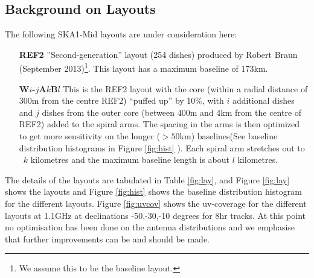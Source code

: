 \documentclass[sfheadings,a4paper,10pt,floats,floatfix]{article}
\begin{document}
\subsection{Background on Layouts}\label{sec:layouts}
The following SKA1-Mid layouts are under consideration here:
\begin{itemize}
\item[{\bf REF2}] ”Second-generation” layout (254 dishes) produced by Robert Braun (September 2013)\footnote{We assume this to
be the baseline layout.}. This layout has a maximum baseline of 173km.
\item[{\bf W$i$-$j$A$k$B$l$}] This is the REF2 layout with the core (within a radial distance of 300m from the centre REF2)
``puffed up'' by 10\%, with $i$ additional dishes and $j$
dishes from the outer core (between 400m and 4km from the centre of REF2) added to the spiral arms. The spacing in
the arms is then optimized to get more sensitivity on the
longer ($>50$km) baselines(See baseline distribution histograms in Figure \ref{fig:hist} ). Each spiral arm stretches out to ~$k$
kilometres and the maximum baseline length is about $l$ kilometres.
\end{itemize}
The details of the layouts are tabulated in Table \ref{fig:lay}, and Figure \ref{fig:lay} shows the layouts and Figure
\ref{fig:hist} shows the baseline distribution histogram for the different layouts. Figure \ref{fig:uvcov} shows the
uv-coverage for the different layouts at 1.1GHz at declinations
-50,-30,-10 degrees for 8hr tracks. At this point no optimisation has
been done on the antenna distributions and we emphasise that further
improvements can be and should be made.
\end{document}
